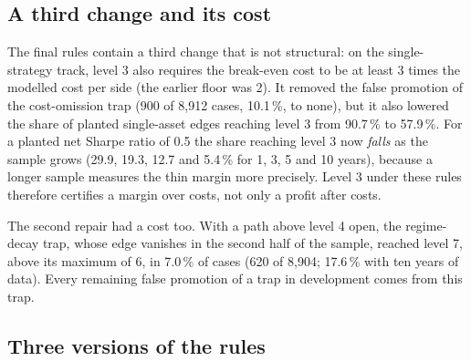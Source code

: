 \documentclass[11pt]{article}
\begin{document}
\subsection{A third change and its cost}\label{sec:third}

The final rules contain a third change that is not structural: on the single-strategy track, level 3 also requires the
break-even cost to be at least 3 times the modelled cost per side (the earlier floor was 2). It removed the false
promotion of the cost-omission trap (900 of 8,912 cases, 10.1\,\%, to none), but it also lowered the share of planted
single-asset edges reaching level 3 from 90.7\,\% to 57.9\,\%. For a planted net Sharpe ratio of 0.5 the share reaching
level 3 now \emph{falls} as the sample grows (29.9, 19.3, 12.7 and 5.4\,\% for 1, 3, 5 and 10 years), because a longer
sample measures the thin margin more precisely. Level 3 under these rules therefore certifies a margin over costs, not
only a profit after costs.

The second repair had a cost too. With a path above level 4 open, the regime-decay trap, whose edge vanishes in the
second half of the sample, reached level 7, above its maximum of 6, in 7.0\,\% of cases (620 of 8,904; 17.6\,\% with ten
years of data). Every remaining false promotion of a trap in development comes from this trap.

\subsection{Three versions of the rules}
\end{document}
